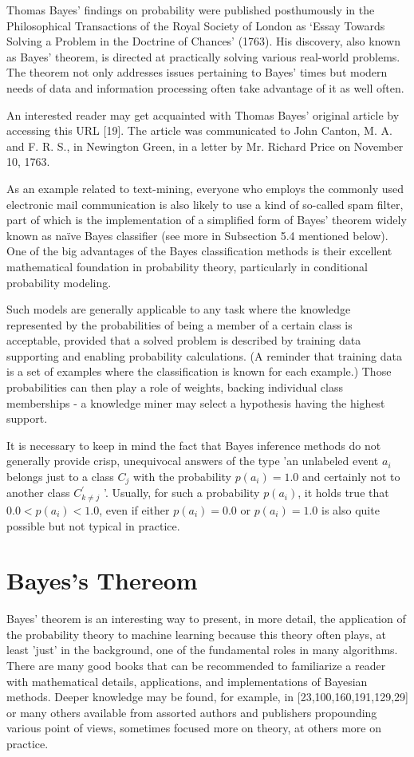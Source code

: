 \documentclass[11pt,openany,executivepaper]{book}
\begin{document}
Thomas Bayes’ findings on probability were published posthumously in the
Philosophical Transactions of the Royal Society of London as ‘Essay Towards
Solving a Problem in the Doctrine of Chances’ (1763). His discovery, also known
as Bayes’ theorem, is directed at practically solving various real-world problems.
The theorem not only addresses issues pertaining to Bayes’ times but modern
needs of data and information processing often take advantage of it as well often.

An interested reader may get acquainted with Thomas Bayes’ original article by accessing this URL [19]. The article was communicated to John Canton,
M. A. and F. R. S., in Newington Green, in a letter by Mr. Richard Price on
November 10, 1763.

As an example related to text-mining, everyone who employs the commonly used electronic mail communication is also likely to use a kind of so-called spam filter, part of which is the implementation of a simplified form of Bayes' theorem widely known as naïve Bayes classifier (see more in Subsection 5.4 mentioned below). One of the big advantages of the Bayes classification methods is their excellent mathematical foundation in probability theory, particularly in conditional probability modeling.

Such models are generally applicable to any task where the knowledge represented by the probabilities of being a member of a certain class is acceptable, provided that a solved problem is described by training data supporting and enabling probability calculations. (A reminder that training data is a set of examples where the classification is known for each example.) Those probabilities can then play a role of weights, backing individual class memberships - a knowledge miner may select a hypothesis having the highest support.

It is necessary to keep in mind the fact that Bayes inference methods do not generally provide crisp, unequivocal answers of the type 'an unlabeled event $a_{i}$ belongs just to a class $C_{j}$ with the probability $p\left(a_{i}\right)=1.0$ and certainly not to another class $C_{k \neq j}^{\prime}$ '. Usually, for such a probability $p\left(a_{i}\right)$, it holds true that $0.0<p\left(a_{i}\right)<1.0$, even if either $p\left(a_{i}\right)=0.0$ or $p\left(a_{i}\right)=1.0$ is also quite possible but not typical in practice.

\section{Bayes's Thereom}
Bayes' theorem is an interesting way to present, in more detail, the application of the probability theory to machine learning because this theory often plays, at least 'just' in the background, one of the fundamental roles in many algorithms. There are many good books that can be recommended to familiarize a reader with mathematical details, applications, and implementations of Bayesian methods. Deeper knowledge may be found, for example, in [23,100,160,191,129,29] or many others available from assorted authors and publishers propounding various point of views, sometimes focused more on theory, at others more on practice.
\end{document}
